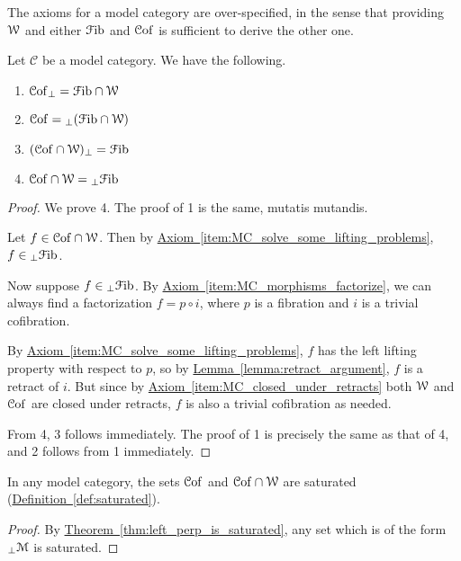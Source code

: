 \documentclass[main.tex]{subfiles}
\begin{document}
The axioms for a model category are over-specified, in the sense that providing $\mathcal{W}$ and either $\mathcal{F}\mathrm{ib}$ and $\mathcal{C}\mathrm{of}$ is sufficient to derive the other one.
\begin{lemma}
  \label{lemma:relations_between_lifting_properties_and_fibrations}
  Let $\mathcal{C}$ be a model category. We have the following.
  \begin{enumerate}
    \item $\mathcal{C}\mathrm{of}_{\perp} = \mathcal{F}\mathrm{ib} \cap \mathcal{W}$
    \item $\mathcal{C}\mathrm{of} = {}_{\perp}(\mathcal{F}\mathrm{ib} \cap \mathcal{W})$
    \item $(\mathcal{C}\mathrm{of} \cap \mathcal{W})_{\perp} = \mathcal{F}\mathrm{ib}$
    \item $\mathcal{C}\mathrm{of} \cap \mathcal{W} = {}_{\perp}\mathcal{F}\mathrm{ib}$
  \end{enumerate}
\end{lemma}
\begin{proof}
  We prove 4. The proof of 1 is the same, mutatis mutandis.

  Let $f \in \mathcal{C}\mathrm{of} \cap \mathcal{W}$. Then by \hyperref[item:MC_solve_some_lifting_problems]{Axiom~\ref*{item:MC_solve_some_lifting_problems}}, $f \in {}_{\perp}\mathcal{F}\mathrm{ib}$.

  Now suppose $f \in {}_{\perp}\mathcal{F}\mathrm{ib}$. By \hyperref[item:MC_morphisms_factorize]{Axiom~\ref*{item:MC_morphisms_factorize}}, we can always find a factorization $f = p \circ i$, where $p$ is a fibration and $i$ is a trivial cofibration.

  By \hyperref[item:MC_solve_some_lifting_problems]{Axiom~\ref*{item:MC_solve_some_lifting_problems}}, $f$ has the left lifting property with respect to $p$, so by \hyperref[lemma:retract_argument]{Lemma~\ref*{lemma:retract_argument}}, $f$ is a retract of $i$. But since by \hyperref[item:MC_closed_under_retracts]{Axiom~\ref*{item:MC_closed_under_retracts}} both $\mathcal{W}$ and $\mathcal{C}\mathrm{of}$ are closed under retracts, $f$ is also a trivial cofibration as needed.

  From 4, 3 follows immediately. The proof of 1 is precisely the same as that of 4, and 2 follows from 1 immediately.
\end{proof}

\begin{corollary}
  \label{cor:trivial_fibrations_and_cofibrations_are_saturated}
  In any model category, the sets $\mathcal{C}\mathrm{of}$ and $\mathcal{C}\mathrm{of} \cap \mathcal{W}$ are saturated (\hyperref[def:saturated]{Definition~\ref*{def:saturated}}).
\end{corollary}
\begin{proof}
  By \hyperref[thm:left_perp_is_saturated]{Theorem~\ref*{thm:left_perp_is_saturated}}, any set which is of the form ${}_{\perp} \mathcal{M}$ is saturated.
\end{proof}
\end{document}
